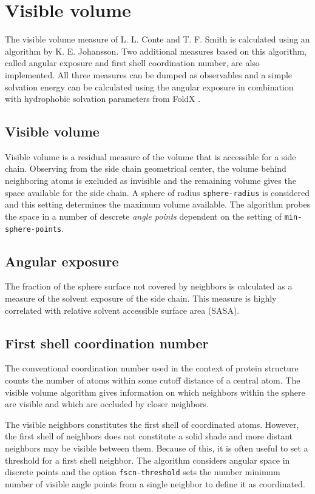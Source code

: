 \section{Visible volume}
The visible volume measure of L. L. Conte and T. F. Smith \cite{conte97visvol} is calculated using an algorithm by K. E. Johansson. Two additional measures based on this algorithm, called angular exposure and first shell coordination number, are also implemented. All three measures can be dumped as observables and a simple solvation energy can be calculated using the angular exposure in combination with hydrophobic solvation parameters from FoldX \cite{schymkowitz05foldx}.

\subsection{Visible volume}
Visible volume is a residual measure of the volume that is accessible for a side chain. Observing from the side chain geometrical center, the volume behind neighboring atoms is excluded as invisible and the remaining volume gives the space available for the side chain. A sphere of radius \texttt{sphere-radius} is considered and this setting determines the maximum volume available. The algorithm probes the space in a number of descrete \emph{angle points} dependent on the setting of \texttt{min-sphere-points}.


\subsection{Angular exposure}
The fraction of the sphere surface not covered by neighbors is calculated as a measure of the solvent exposure of the side chain. This measure is highly correlated with relative solvent accessible surface area (SASA). 

\subsection{First shell coordination number}
The conventional coordination number used in the context of protein structure counts the number of atoms within some cutoff distance of a central atom. The visible volume algorithm gives information on which neighbors within the sphere are visible and which are occluded by closer neighbors. 

The visible neighbors constitutes the first shell of coordinated atoms. However, the first shell of neighbors does not constitute a solid shade and more distant neighbors may be visible between them. Because of this, it is often useful to set a threshold for a first shell neighbor. The algorithm considers angular space in discrete points and the option \texttt{fscn-threshold} sets the number minimum number of visible angle points from a single neighbor to define it as coordinated.

